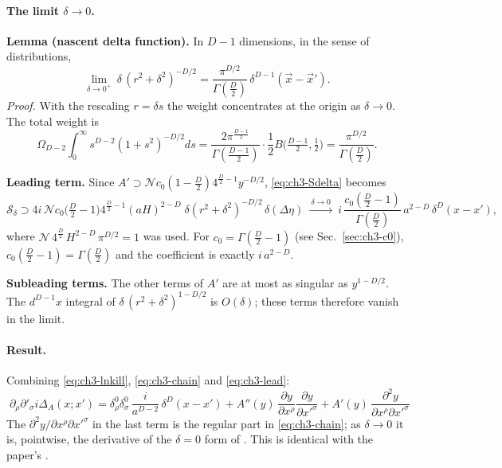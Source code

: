 \paragraph{The limit $\delta\to0$.}
\textbf{Lemma (nascent delta function).} In $D-1$ dimensions, in the sense of distributions,
\begin{equation}
\lim_{\delta\to0^+}\ \delta\,(r^2+\delta^2)^{-D/2}=\frac{\pi^{D/2}}{\Gamma(\frac D2)}\,\delta^{D-1}(\vec x-\vec x').
\label{eq:ch3-nascent}
\end{equation}
\emph{Proof.} With the rescaling $r=\delta s$ the weight concentrates at the origin as $\delta\to0$. The total weight is
\begin{equation*}
\Omega_{D-2}\int_0^\infty s^{D-2}(1+s^2)^{-D/2}ds=\frac{2\pi^{\frac{D-1}2}}{\Gamma(\frac{D-1}2)}\cdot\frac12B\big(\tfrac{D-1}2,\tfrac12\big)=\frac{\pi^{D/2}}{\Gamma(\frac D2)} .
\end{equation*}

\noindent\textbf{Leading term.} Since $A'\supset\mathcal N c_0(1-\tfrac D2)4^{\frac D2-1}y^{-D/2}$, \eqref{eq:ch3-Sdelta} becomes
\begin{equation}
\mathcal S_\delta\supset4i\,\mathcal Nc_0\big(\tfrac D2-1\big)4^{\frac D2-1}(aH)^{2-D}\;\delta(r^2+\delta^2)^{-D/2}\,\delta(\Delta\eta)
\ \xrightarrow{\ \delta\to0\ }\ i\,\frac{c_0(\frac D2-1)}{\Gamma(\frac D2)}\,a^{2-D}\,\delta^D(x-x'),
\label{eq:ch3-lead}
\end{equation}
where $\mathcal N\,4^{\frac D2}\,H^{2-D}\,\pi^{D/2}=1$ was used. For $c_0=\Gamma(\tfrac D2-1)$ (see Sec.~\ref{sec:ch3-c0}), $c_0(\tfrac D2-1)=\Gamma(\tfrac D2)$ and the coefficient is exactly $i\,a^{2-D}$.

\noindent\textbf{Subleading terms.} The other terms of $A'$ are at most as singular as $y^{1-D/2}$. The $d^{D-1}x$ integral of $\delta\,(r^2+\delta^2)^{1-D/2}$ is $O(\delta)$;
these terms therefore vanish in the limit.

\paragraph{Result.}
Combining \eqref{eq:ch3-lnkill}, \eqref{eq:ch3-chain} and \eqref{eq:ch3-lead}:
{%
\begin{equation}
\boxed{\;\partial_\rho\partial'_\sigma i\Delta_A(x;x')=\delta^0_\rho\delta^0_\sigma\,\frac{i}{a^{D-2}}\,\delta^D(x-x')+A''(y)\,\frac{\partial y}{\partial x^\rho}\frac{\partial y}{\partial x'^\sigma}
+A'(y)\,\frac{\partial^2y}{\partial x^\rho\partial x'^\sigma}\;}
\tag{I.52}\label{eq:ch3-52}
\end{equation}
}
The $\partial^2y/\partial x^\rho\partial x'^\sigma$ in the last term is the regular part in \eqref{eq:ch3-chain}; as $\delta\to0$ it is, pointwise, the derivative of the $\delta=0$ form of .
This is identical with the paper's  \chIIIok.

